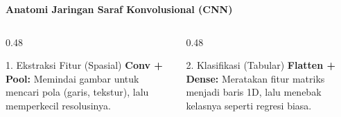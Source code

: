 \documentclass{beamer}
\newcommand{\y}{\mathbf{y}}
\begin{document}
\begin{frame}{\textbf{Anatomi Jaringan Saraf Konvolusional (CNN)}}

    \vspace{0.3cm}
    \begin{columns}
        \begin{column}{0.48\textwidth}
            \begin{alertblock}{1. Ekstraksi Fitur (Spasial)}
                \textbf{Conv + Pool:} Memindai gambar untuk mencari pola (garis, tekstur), lalu memperkecil resolusinya.
            \end{alertblock}
        \end{column}
        \begin{column}{0.48\textwidth}
            \begin{alertblock}{2. Klasifikasi (Tabular)}
                \textbf{Flatten + Dense:} Meratakan fitur matriks menjadi baris 1D, lalu menebak kelasnya seperti regresi biasa.
            \end{alertblock}
        \end{column}
    \end{columns}
\end{frame}
\end{document}
